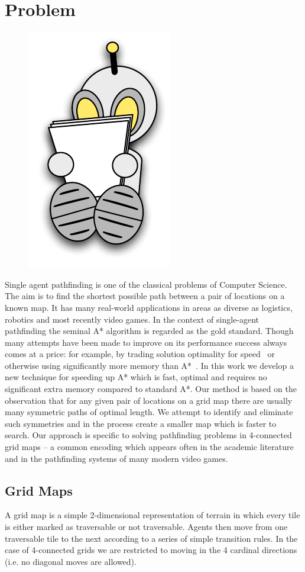 \section{Problem}
 \begin{figure}
\vspace{-2.5em}
		\includegraphics[width=0.18\columnwidth]{diagrams/robot_reading.pdf}
\vspace{-2em}
 \end{figure}
Single agent pathfinding is one of the classical problems of Computer Science.
The aim is to find the shortest possible path between a pair of locations 
on a known map. 
It has many real-world applications in areas as diverse as logistics, 
robotics and most recently video games.
\newline \newline
In the context of single-agent pathfinding the seminal A* algorithm 
\cite{hart68} is regarded as the gold standard. 
Though many attempts have been made to improve on its performance success always 
comes at a price: for example, by trading solution
optimality for speed~\cite{botea04} or otherwise using significantly more memory than A*~\cite{sturtevant09}.
In this work we develop a new technique for speeding up A* which is fast,
optimal and requires no significant extra memory compared to standard
A*.
Our method is based on the observation that for any given pair of locations on a
grid map there are usually many symmetric paths of optimal length. 
We attempt to identify and eliminate such symmetries and in the process create
a smaller map which is faster to search.
Our approach is specific to solving pathfinding problems in 4-connected grid
maps -- a common encoding which appears often in the academic literature and in
the pathfinding systems of many modern video games.

\subsection{Grid Maps}
A grid map is a simple 2-dimensional representation of terrain in which every
tile is either marked as traversable or not traversable.
Agents then move from one traversable tile to the next according to a series of 
simple transition rules.
In the case of 4-connected grids we are restricted to moving in the 4 cardinal
directions (i.e. no diagonal moves are allowed).

